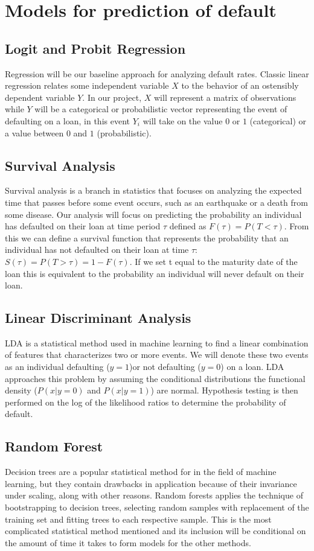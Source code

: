 \documentclass[sigconf, 11pt]{acmart}
\begin{document}
\section{Models for prediction of default}
\subsection{Logit and Probit Regression}
Regression will be our baseline approach for analyzing default rates. Classic linear regression relates some independent variable $X$ to the behavior of an ostensibly dependent variable $Y$. In our project, $X$ will represent a matrix of observations while $Y$ will be a categorical or probabilistic vector representing the event of defaulting on a loan, in this event $Y_i$ will take on the value $0$ or $1$ (categorical) or a value between $0$ and $1$ (probabilistic).
\subsection{Survival Analysis}
Survival analysis is a branch in statistics that focuses on analyzing the expected time that passes before some event occurs, such as an earthquake or a death from some disease. Our analysis will focus on predicting the probability an individual has defaulted on their loan at time period $\tau$ defined as $F(\tau) = P(T<\tau)$. From this we can define a survival function that represents the probability that an individual has not defaulted on their loan at time $\tau$: $S(\tau) = P(T>\tau) = 1-F(\tau)$. If we set t equal to the maturity date of the loan this is equivalent to the probability an individual will never default on their loan.
\subsection{Linear Discriminant Analysis}
LDA is a statistical method used in machine learning to find a linear combination of features that characterizes two or more events. We will denote these two events as an individual defaulting ($y=1$)or not defaulting ($y=0$) on a loan. LDA approaches this problem by assuming the conditional distributions the functional density ($P(x|y=0)$ and $P(x|y=1)$) are normal. Hypothesis testing is then performed on the log of the likelihood ratios to determine the probability of default.
\subsection{Random Forest}
Decision trees are a popular statistical method for in the field of machine learning, but they contain drawbacks in application because of their invariance under scaling, along with other reasons. Random forests applies the technique of bootstrapping to decision trees, selecting random samples with replacement of the training set and fitting trees to each respective sample. This is the most complicated statistical method mentioned and its inclusion will be conditional on the amount of time it takes to form models for the other methods.
\end{document}
